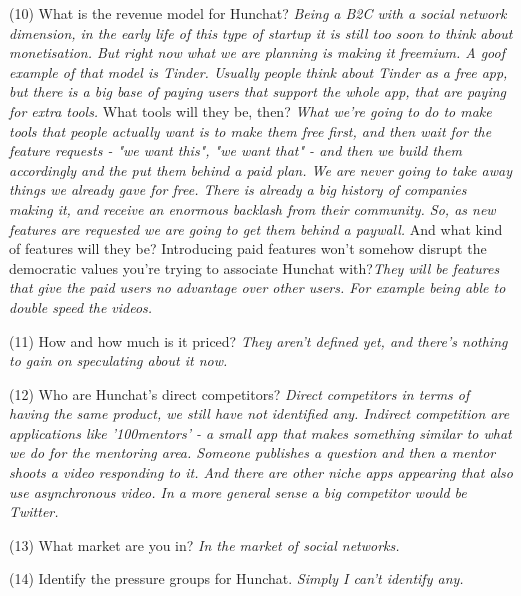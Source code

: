 \documentclass[11pt]{article}
\begin{document}
(10) What is the revenue model for Hunchat? \textit{Being a B2C with a social network dimension, in the early life of this type of startup it is still too soon to think about monetisation. But right now what we are planning is making it freemium. A goof example of that model is Tinder. Usually people think about Tinder as a free app, but there is a big base of paying users that support the whole app, that are paying for extra tools. } What tools will they be, then? \textit{What we're going to do to make tools that people actually want is to make them free first, and then wait for the feature requests - "we want this", "we want that" -  and then we build them accordingly and the put them behind a paid plan. We are never going to take away things we already gave for free. There is already a big history of companies making it, and receive an enormous backlash from their community. So, as new features are requested we are going to get them behind a paywall.} And what kind of features will they be? Introducing paid features won't somehow disrupt  the democratic values you're trying to associate Hunchat with?\textit{They will be features that give the paid users no advantage over other users. For example being able to double speed the videos.}

(11) How and how much is it priced? \textit{They aren't defined yet, and there's nothing to gain on speculating about it now.}

(12) Who are Hunchat’s direct competitors? \textit{Direct competitors in terms of having the same product, we still have not identified any. Indirect competition are applications like '100mentors' - a small app that makes something similar to what we do for the mentoring area. Someone publishes a question and then a mentor shoots a video responding to it. And there are other niche apps appearing that also use asynchronous video. In a more general sense a big competitor would be Twitter. }

(13) What market are you in? \textit{In the market of social networks.}

(14) Identify the pressure groups for Hunchat. \textit{Simply I can't identify any.} 
\end{document}
